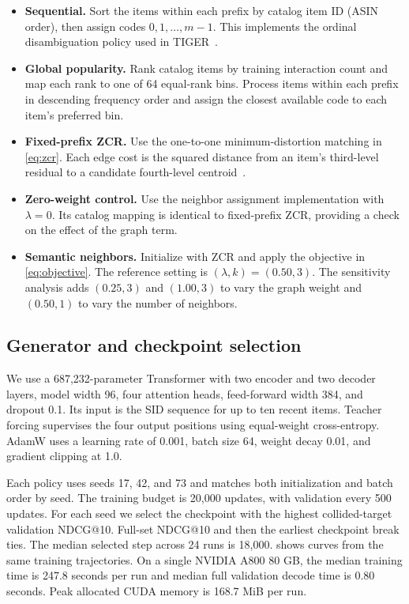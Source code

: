 \documentclass[10pt,twocolumn,letterpaper]{article}
\begin{document}
\begin{itemize}
    \item \textbf{Sequential.} Sort the items within each prefix by catalog item ID (ASIN order), then assign codes $0,1,\dots,m-1$.
    This implements the ordinal disambiguation policy used in TIGER~\cite{rajput2023generative}.
    \item \textbf{Global popularity.} Rank catalog items by training interaction count and map each rank to one of 64 equal-rank bins.
    Process items within each prefix in descending frequency order and assign the closest available code to each item's preferred bin.
    \item \textbf{Fixed-prefix ZCR.} Use the one-to-one minimum-distortion matching in \cref{eq:zcr}.
    Each edge cost is the squared distance from an item's third-level residual to a candidate fourth-level centroid~\cite{zhang2026faithful}.
    \item \textbf{Zero-weight control.} Use the neighbor assignment implementation with $\lambda=0$.
    Its catalog mapping is identical to fixed-prefix ZCR, providing a check on the effect of the graph term.
    \item \textbf{Semantic neighbors.} Initialize with ZCR and apply the objective in \cref{eq:objective}.
    The reference setting is $(\lambda,k)=(0.50,3)$.
    The sensitivity analysis adds $(0.25,3)$ and $(1.00,3)$ to vary the graph weight and $(0.50,1)$ to vary the number of neighbors.
\end{itemize}

\subsection{Generator and checkpoint selection}
We use a 687,232-parameter Transformer with two encoder and two decoder layers, model width 96, four attention heads, feed-forward width 384, and dropout 0.1.
Its input is the SID sequence for up to ten recent items.
Teacher forcing supervises the four output positions using equal-weight cross-entropy.
AdamW uses a learning rate of 0.001, batch size 64, weight decay 0.01, and gradient clipping at 1.0.

Each policy uses seeds 17, 42, and 73 and matches both initialization and batch order by seed.
The training budget is 20,000 updates, with validation every 500 updates.
For each seed we select the checkpoint with the highest collided-target validation NDCG@10.
Full-set NDCG@10 and then the earliest checkpoint break ties.
The median selected step across 24 runs is 18,000.
 shows curves from the same training trajectories.
On a single NVIDIA A800 80 GB, the median training time is 247.8 seconds per run and median full validation decode time is 0.80 seconds.
Peak allocated CUDA memory is 168.7 MiB per run.
\end{document}
